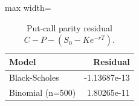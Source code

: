 \begin{table}
\centering
\small
\caption{Put-call parity residual $C-P-(S_0-Ke^{-rT})$.}
\label{tab:e8_parity}
\begin{adjustbox}{max width=\textwidth}
\begin{tabular}{lr}
\toprule
Model & Residual \\
\midrule
Black-Scholes & -1.13687e-13 \\
Binomial (n=500) & 1.80265e-11 \\
\bottomrule
\end{tabular}
\end{adjustbox}
\end{table}
